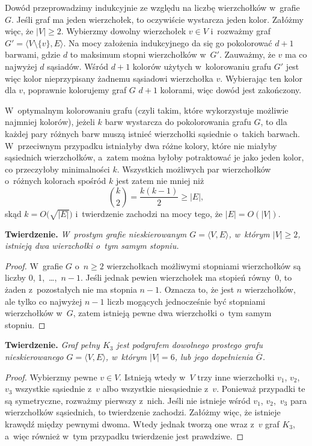 \subproblem %
Dowód przeprowadzimy indukcyjnie ze względu na liczbę wierzchołków w~grafie $G$. Jeśli graf ma jeden wierzchołek, to oczywiście wystarcza jeden kolor. Załóżmy więc, że $|V|\ge2$. Wybierzmy dowolny wierzchołek $v\in V$ i~rozważmy graf $G'=\bigl\langle V\setminus\{v\},E\bigr\rangle$. Na mocy założenia indukcyjnego da się go pokolorować $d+1$ barwami, gdzie $d$ to maksimum stopni wierzchołków w~$G'$. Zauważmy, że $v$ ma co najwyżej $d$ sąsiadów. Wśród $d+1$ kolorów użytych w~kolorowaniu grafu $G'$ jest więc kolor nieprzypisany żadnemu sąsiadowi wierzchołka $v$. Wybierając ten kolor dla $v$, poprawnie kolorujemy graf $G$ $d+1$ kolorami, więc dowód jest zakończony.

\subproblem %
W~optymalnym kolorowaniu grafu (czyli takim, które wykorzystuje możliwie najmniej kolorów), jeżeli $k$ barw wystarcza do pokolorowania grafu $G$, to dla każdej pary różnych barw muszą istnieć wierzchołki sąsiednie o~takich barwach. W~przeciwnym przypadku istniałyby dwa różne kolory, które nie miałyby sąsiednich wierzchołków, a~zatem można byłoby potraktować je jako jeden kolor, co przeczyłoby minimalności $k$. Wszystkich możliwych par wierzchołków o~różnych kolorach spośród $k$ jest zatem nie mniej niż
\[
	\binom{k}{2} = \frac{k(k-1)}{2} \ge |E|,
\]
skąd $k=O\bigl(\!\sqrt{|E|}\bigr)$ i~twierdzenie zachodzi na mocy tego, że $|E|=O(|V|)$.


\subproblem %
\textsf{\textbf{Twierdzenie.}} \textit{W~prostym grafie nieskierowanym\/ $G=\langle V,E\rangle$, w~którym\/ $|V|\ge2$, istnieją dwa wierzchołki o~tym samym stopniu.}
\begin{proof}
W~grafie $G$ o~$n\ge2$ wierzchołkach możliwymi stopniami wierzchołków są liczby 0, 1,~\dots,~$n-1$. Jeśli jednak pewien wierzchołek ma stopień równy~0, to żaden z~pozostałych nie ma stopnia $n-1$. Oznacza to, że jest $n$ wierzchołków, ale tylko co najwyżej $n-1$ liczb mogących jednocześnie być stopniami wierzchołków w~$G$, zatem istnieją pewne dwa wierzchołki o~tym samym stopniu.
\end{proof}

\subproblem %
\textsf{\textbf{Twierdzenie.}} \textit{Graf pełny\/ $K_3$ jest podgrafem dowolnego prostego grafu nieskierowanego\/ $G=\langle V,E\rangle$, w~którym\/ $|V|=6$, lub jego dopełnienia\/ $\overline{G}$.}
\begin{proof}
Wybierzmy pewne $v\in V$. Istnieją wtedy w~$V$ trzy inne wierzchołki $v_1$, $v_2$,~$v_3$ wszystkie sąsiednie z~$v$ albo wszystkie niesąsiednie z~$v$. Ponieważ przypadki te są symetryczne, rozważmy pierwszy z~nich. Jeśli nie istnieje wśród $v_1$, $v_2$,~$v_3$ para wierzchołków sąsiednich, to twierdzenie zachodzi. Załóżmy więc, że istnieje krawędź między pewnymi dwoma. Wtedy jednak tworzą one wraz z~$v$ graf $K_3$, a~więc również w~tym przypadku twierdzenie jest prawdziwe.
\end{proof}

